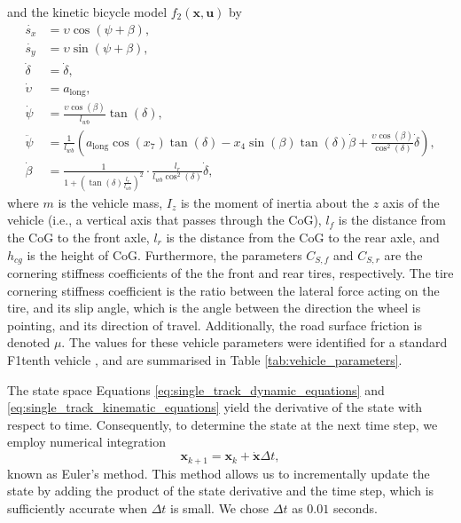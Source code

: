 and the kinetic bicycle model $f_2(\mathbf{x}, \mathbf{u})$ by 
\begin{equation}
\begin{split}
    \dot{s_x} &= \upsilon \cos(\psi + \beta), \\
    \dot{s_y} &= \upsilon \sin(\psi + \beta), \\
    \dot{\delta} &= \dot{\delta}, \\
    \dot{\upsilon} &= a_{\text{long}}, \\
    \dot{\psi} &= \frac{\upsilon \cos(\beta)}{l_{wb}} \tan(\delta), \\
    \ddot{\psi} &= \frac{1}{l_{wb}} (a_{\text{long}} \cos(x_7)\tan(\delta) - x_4\sin(\beta)\tan(\delta)\dot{\beta} + \frac{\upsilon \cos(\beta)}{\cos^2(\delta)} \dot{\delta} ), \\
    \dot{\beta} &= \frac{1}{1+(\tan(\delta)\frac{l_r}{l_{wb}})^2} \cdot \frac{l_r}{l_{wb} \cos^2(\delta)} \dot{\delta},
\label{eq:single_track_kinematic_equations}
\end{split}
\end{equation}
where $m$ is the vehicle mass, $I_z$ is the moment of inertia about the $z$ axis of the vehicle (i.e., a vertical axis that passes through the CoG), $l_f$ is the distance from the CoG to the front axle, $l_r$ is the distance from the CoG to the rear axle, and $h_{cg}$ is the height of CoG.
Furthermore, the parameters $C_{S,f}$ and $C_{S,r}$ are the cornering stiffness coefficients of the the front and rear tires, respectively.
The tire cornering stiffness coefficient is the ratio between the lateral force acting on the tire, and its slip angle, which is the angle between the direction the wheel is pointing, and its direction of travel.
Additionally, the road surface friction is denoted $\mu$.
The values for these vehicle parameters were identified for a standard F1tenth vehicle \cite{f1tenth}, and are summarised in Table \ref{tab:vehicle_parameters}. 





The state space Equations \ref{eq:single_track_dynamic_equations} and \ref{eq:single_track_kinematic_equations} yield the derivative of the state with respect to time. 
Consequently, to determine the state at the next time step, we employ numerical integration 
\begin{equation}
\mathbf{x}_{k+1} = \mathbf{x}_k + \mathbf{\dot{x}} \Delta t,
\end{equation}
known as Euler's method. 
This method allows us to incrementally update the state by adding the product of the state derivative and the time step, which is sufficiently accurate when $\Delta t$ is small.
We chose $\Delta t$ as $0.01$ seconds.


